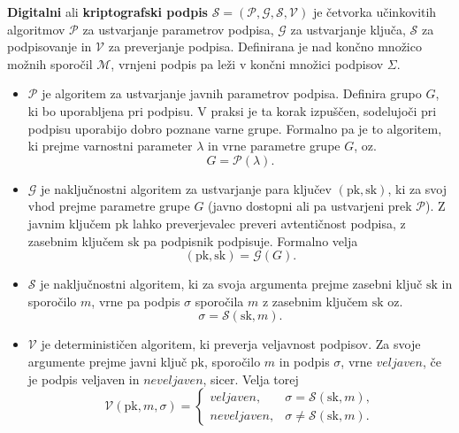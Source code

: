 \documentclass[isrm2, tisk]{fmfdelo}
\begin{document}
\begin{definicija}
\label{def:digisig}
    \textbf{Digitalni} ali \textbf{kriptografski podpis} $\mathcal{S} = (\mathcal{P}, \mathcal{G},
    \mathcal{S}, \mathcal{V})$ je četvorka učinkovitih algoritmov $\mathcal{P}$ za ustvarjanje parametrov
    podpisa, $\mathcal{G}$ za ustvarjanje ključa, $\mathcal{S}$ za podpisovanje in $\mathcal{V}$ za
    preverjanje podpisa. Definirana je nad končno množico možnih  sporočil $\mathcal{M}$, vrnjeni
    podpis pa leži v končni množici podpisov $\Sigma$.
    \begin{itemize}
        \item $\mathcal{P}$ je algoritem za ustvarjanje javnih parametrov podpisa. Definira grupo $G$,
            ki bo uporabljena pri podpisu. V praksi je ta korak izpuščen, sodelujoči pri podpisu
            uporabijo dobro poznane varne grupe. Formalno pa je to algoritem, ki prejme varnostni
            parameter $\lambda$ in vrne parametre grupe $G$, oz.\
            $$
            G = \mathcal{P}(\lambda).
            $$
        \item $\mathcal{G}$ je naključnostni algoritem za ustvarjanje para ključev $(\text{pk}, \text{sk})$, 
            ki za svoj vhod prejme parametre grupe $G$ (javno dostopni ali pa ustvarjeni prek $\mathcal{P}$).
            Z javnim ključem $\text{pk}$ lahko preverjevalec preveri avtentičnost podpisa, z zasebnim
            ključem $\text{sk}$ pa podpisnik podpisuje. Formalno velja
            $$
            (\text{pk}, \text{sk}) = \mathcal{G}(G).
            $$
        \item $\mathcal{S}$ je naključnostni algoritem, ki za svoja argumenta prejme zasebni ključ $\text{sk}$ 
            in sporočilo $m$, vrne pa podpis $\sigma$ sporočila $m$ z zasebnim ključem $\text{sk}$
            oz.\ 
            $$ 
            \sigma = \mathcal{S}(\text{sk}, m).
            $$
        \item $\mathcal{V}$ je determinističen algoritem, ki preverja veljavnost podpisov. Za svoje argumente
            prejme javni ključ $\text{pk}$, sporočilo $m$ in podpis $\sigma$, vrne $veljaven$, če je podpis 
            veljaven in $neveljaven$, sicer. Velja torej
            $$ 
            \mathcal{V}(\text{pk}, m, \sigma) = 
            \begin{cases}
                veljaven, & \sigma = \mathcal{S}(\text{sk}, m), \\
                neveljaven, & \sigma \neq \mathcal{S}(\text{sk}, m).
            \end{cases}
            $$
    \end{itemize}
\end{definicija}
\end{document}
